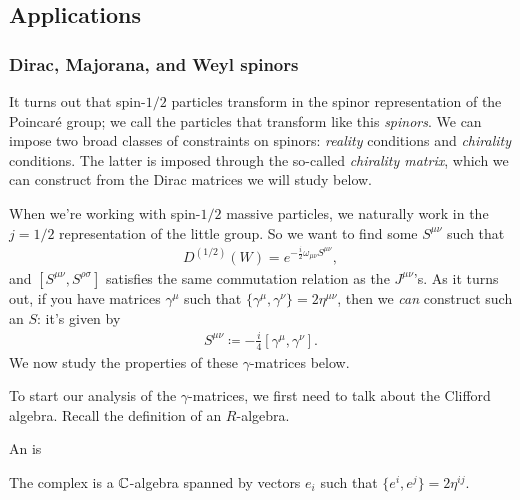 \documentclass[11pt]{article}
\begin{document}
\subsection{Applications}

\subsubsection{Dirac, Majorana, and Weyl spinors}

\begin{reemark}
    It turns out that spin-$1/2$ particles transform in the spinor
    representation of the Poincaré group; we call the particles
    that transform like this \emph{spinors}. We can impose two
    broad classes of constraints on spinors: \emph{reality} conditions
    and \emph{chirality} conditions. The latter is imposed through the
    so-called \emph{chirality matrix}, which we can construct from
    the Dirac matrices we will study below.
\end{reemark}

\begin{eexample}
    When we're working with spin-$1/2$ massive particles, we naturally work
    in the $j = 1/2$ representation of the little group. So we want to find
    some $S^{\mu \nu}$ such that
    \begin{align*}
        D^{(1/2)}(W) = e^{- \frac{i}{2} \omega_{\mu \nu} S^{\mu \nu}},
    \end{align*} 
    and $[S^{\mu \nu}, S^{\rho \sigma}]$ satisfies the same commutation relation
    as the $J^{\mu \nu}$'s. As it turns out, if you have matrices $\gamma^\mu$
    such that $\{ \gamma^\mu, \gamma^\nu \} = 2 \eta^{\mu \nu}$, then we
    \emph{can} construct such an $S$: it's given by
    \begin{align*}
        \boxed{S^{\mu \nu} \coloneqq - \frac{i}{4} [\gamma^\mu, \gamma^\nu].}
    \end{align*}
    We now study the properties of these $\gamma$-matrices below.
\end{eexample}

To start our analysis of the $\gamma$-matrices, we first need to talk 
about the Clifford algebra. Recall the definition of an $R$-algebra.

\begin{definition}
    An  is 
\end{definition}

\begin{definition}
    The complex  is a $\mathbb{C}$-algebra spanned
    by vectors $e_i$ such that $\{ e^i, e^j \} = 2 \eta^{ij}$. 

\end{definition}
\end{document}
